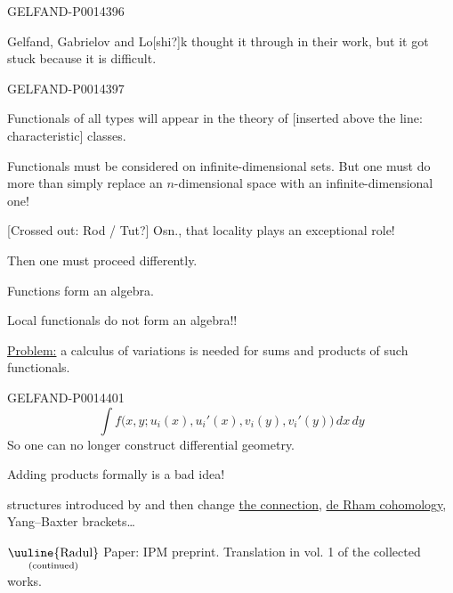 \begin{GelfandAdjacentEvidence}{GELFAND-P001439}{6}


Gelfand, Gabrielov and Lo[shi?]k thought it through in their work, but it got stuck because it is difficult.
\end{GelfandAdjacentEvidence}
\begin{GelfandAdjacentEvidence}{GELFAND-P001439}{7}


Functionals of all types will appear in the theory of [inserted above the line: characteristic] classes.

Functionals must be considered on infinite-dimensional sets. But one must do more than simply replace an \(n\)-dimensional space with an infinite-dimensional one!

[Crossed out: Rod / Tut?] Osn., that locality plays an exceptional role!
\end{GelfandAdjacentEvidence}


Then one must proceed differently.

Functions form an algebra.

Local functionals do not form an algebra!!

\uline{Problem:} a calculus of variations is needed for sums and products of such functionals.


\begin{GelfandAdjacentEvidence}{GELFAND-P001440}{1}
\[
\int f\bigl(x,y;u_i(x),u_i'(x),v_i(y),v_i'(y)\bigr)\,dx\,dy
\]
So one can no longer construct differential geometry.

Adding products formally is a bad idea!

 structures introduced by  and
then change \uline{the connection}, \uline{de Rham cohomology}, Yang–Baxter brackets\ldots
{}
\end{GelfandAdjacentEvidence}


\(\underset{\text{(continued)}}{\text{\uuline{Radul}}}\)
\qquad Paper: IPM preprint. Translation in vol. 1 of the collected works.

